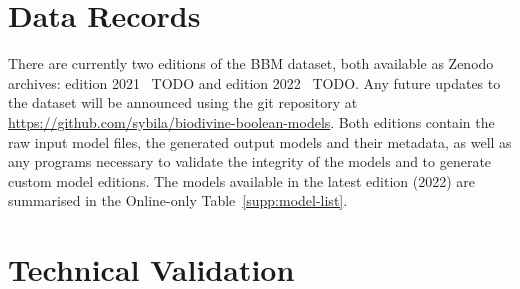 \documentclass[fleqn,10pt]{wlscirep}
\newcommand{\todo}[1]{{\color{red} #1}}
\begin{document}

\section*{Data Records}

There are currently two editions of the BBM dataset, both available as Zenodo archives: edition 2021~\todo{TODO} and edition 2022~\todo{TODO}. Any future updates to the dataset will be announced using the git repository at \hyperlink{https://github.com/sybila/biodivine-boolean-models}{https://github.com/sybila/biodivine-boolean-models}. Both editions contain the raw input model files, the generated output models and their metadata, as well as any programs necessary to validate the integrity of the models and to generate custom model editions. The models available in the latest edition (2022) are summarised in the Online-only Table~\ref{supp:model-list}.



\section*{Technical Validation}
\end{document}
